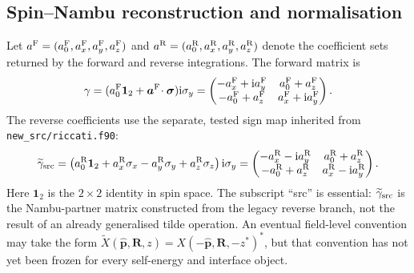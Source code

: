 \documentclass[11pt,a4paper]{article}
\newcommand{\ii}{\mathrm{i}}
\newcommand{\oneSpin}{\mathbf{1}_{2}}
\newcommand{\phat}{\hat{\bm p}}
\begin{document}
\subsection{Spin--Nambu reconstruction and normalisation}

Let $a^{\rm F}=(a^{\rm F}_0,a^{\rm F}_x,a^{\rm F}_y,a^{\rm F}_z)$ and
$a^{\rm R}=(a^{\rm R}_0,a^{\rm R}_x,a^{\rm R}_y,a^{\rm R}_z)$ denote the
coefficient sets returned by the forward and reverse integrations.  The
forward matrix is
\begin{equation}
  \gamma
  =(a^{\rm F}_0\oneSpin+\bm a^{\rm F}\!\cdot\bm\sigma)\ii\sigma_y
  =\begin{pmatrix}
    -a^{\rm F}_x+\ii a^{\rm F}_y & a^{\rm F}_0+a^{\rm F}_z\\
    -a^{\rm F}_0+a^{\rm F}_z & a^{\rm F}_x+\ii a^{\rm F}_y
   \end{pmatrix}.
  \label{eq:forward-coherence-matrix}
\end{equation}
The reverse coefficients use the separate, tested sign map inherited from
\texttt{new\_src/riccati.f90}:
\begin{equation}
  \widetilde\gamma_{\rm src}
  =\left(a^{\rm R}_0\oneSpin+a^{\rm R}_x\sigma_x
         -a^{\rm R}_y\sigma_y+a^{\rm R}_z\sigma_z\right)\ii\sigma_y
  =\begin{pmatrix}
    -a^{\rm R}_x-\ii a^{\rm R}_y & a^{\rm R}_0+a^{\rm R}_z\\
    -a^{\rm R}_0+a^{\rm R}_z & a^{\rm R}_x-\ii a^{\rm R}_y
   \end{pmatrix}.
  \label{eq:reverse-coherence-matrix}
\end{equation}
Here $\oneSpin$ is the $2\times2$ identity in spin space.  The subscript
``src'' is essential: $\widetilde\gamma_{\rm src}$ is the Nambu-partner
matrix constructed from the legacy reverse branch, not the result of an
already generalised tilde operation.  An eventual field-level convention may
take the form
$\widetilde X(\phat,\bm R,z)=X(-\phat,\bm R,-z^*)^*$, but that convention has
not yet been frozen for every self-energy and interface object.
\end{document}
